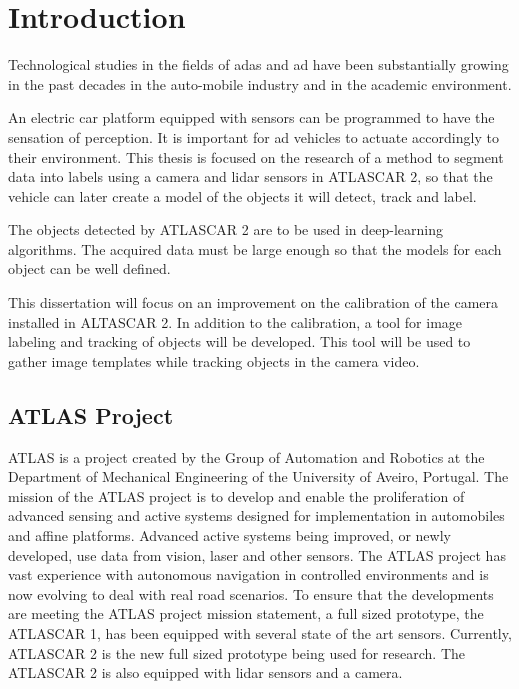 \chapter{Introduction}
Technological studies in the fields of \gls{adas} and \gls{ad} have been substantially growing in the past decades in the auto-mobile industry and in the academic environment. 

An electric car platform equipped with sensors can be programmed to have the sensation of perception. It is important for \gls{ad} vehicles to actuate accordingly to their environment. This thesis is focused on the research of a method to segment data into labels using a camera and \gls{lidar} sensors in ATLASCAR 2, so that the vehicle can later create a model of the objects it will detect, track and label.

The objects detected by ATLASCAR 2 are to be used in deep-learning algorithms. The acquired data must be large enough so that the models for each object can be well defined.

This dissertation will focus on an improvement on the calibration of the camera installed in ALTASCAR 2. In addition to the calibration, a tool for image labeling and tracking of objects will be developed. This tool will be used to gather image templates while tracking objects in the camera video. 

\section{ATLAS Project}

ATLAS is a project created by the Group of Automation and Robotics at the Department of Mechanical Engineering of the University of Aveiro, Portugal. The mission of the ATLAS project is to develop and enable the proliferation of advanced sensing and active systems designed for implementation in automobiles and affine platforms. Advanced active systems being improved, or newly developed, use data from vision, laser and other sensors. The ATLAS project has vast experience with autonomous navigation in controlled environments and is now evolving to deal with real road scenarios. To ensure that the developments are meeting the ATLAS project mission statement, a full sized prototype, the ATLASCAR 1, has been equipped with several state of the art sensors. \cite{LARlabs} Currently, ATLASCAR 2 is the new full sized prototype being used for research. The ATLASCAR 2 is also equipped with \gls{lidar} sensors and a camera.

